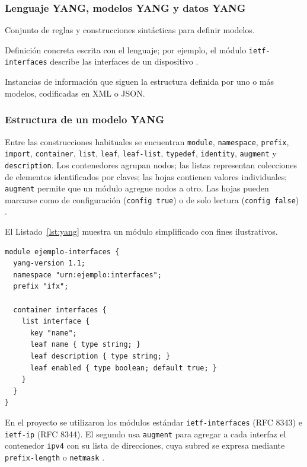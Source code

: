 \subsubsection{Lenguaje YANG, modelos YANG y datos YANG}
\begin{description}[style=nextline]
  \item[Lenguaje YANG] Conjunto de reglas y construcciones sintácticas para definir modelos.
  \item[Modelo o módulo YANG] Definición concreta escrita con el lenguaje; por ejemplo, el módulo \texttt{ietf-interfaces} describe las interfaces de un dispositivo \parencite{rfc8343}.
  \item[Datos YANG] Instancias de información que siguen la estructura definida por uno o más modelos, codificadas en XML o JSON.
\end{description}

\subsubsection{Estructura de un modelo YANG}
Entre las construcciones habituales se encuentran \texttt{module}, \texttt{namespace}, \texttt{prefix}, \texttt{import}, \texttt{container}, \texttt{list}, \texttt{leaf}, \texttt{leaf-list}, \texttt{typedef}, \texttt{identity}, \texttt{augment} y \texttt{description}. Los contenedores agrupan nodos; las listas representan colecciones de elementos identificados por claves; las hojas contienen valores individuales; \texttt{augment} permite que un módulo agregue nodos a otro. Las hojas pueden marcarse como de configuración (\texttt{config true}) o de solo lectura (\texttt{config false}) \parencite{rfc7950}.

El Listado~\ref{lst:yang} muestra un módulo simplificado con fines ilustrativos.
\begin{lstlisting}[language={},caption={Fragmento ilustrativo de un modelo YANG},label={lst:yang}]
module ejemplo-interfaces {
  yang-version 1.1;
  namespace "urn:ejemplo:interfaces";
  prefix "ifx";

  container interfaces {
    list interface {
      key "name";
      leaf name { type string; }
      leaf description { type string; }
      leaf enabled { type boolean; default true; }
    }
  }
}
\end{lstlisting}

En el proyecto se utilizaron los módulos estándar \texttt{ietf-interfaces} (RFC 8343) e \texttt{ietf-ip} (RFC 8344). El segundo usa \texttt{augment} para agregar a cada interfaz el contenedor \texttt{ipv4} con su lista de direcciones, cuya subred se expresa mediante \texttt{prefix-length} o \texttt{netmask} \parencite{rfc8343,rfc8344}.

